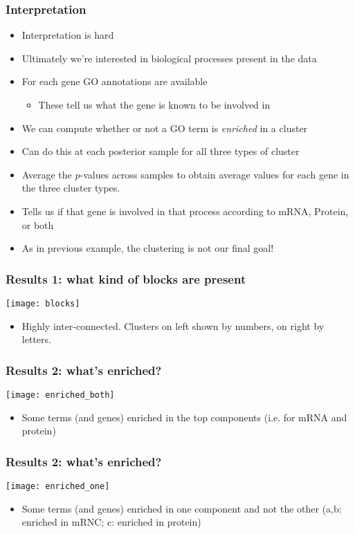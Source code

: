 \begin{frame}
	\frametitle{Interpretation}
	\begin{itemize}
		\item Interpretation is hard
		\item Ultimately we're interested in biological processes present in the data
		\item<2->For each gene \ac{GO} annotations are available
		\begin{itemize}
			\item These tell us what the gene is known to be involved in 
		\end{itemize}
		\item<3->We can compute whether or not a \ac{GO} term is \emph{enriched} in a cluster
		\item<4->Can do this at each posterior sample for all three types of cluster
		\item<5->Average the $p$-values across samples to obtain average values for each gene in the three cluster types.
		\item<6->Tells us if that gene is involved in that process according to mRNA, Protein, or both
		\item<7->As in previous example, the clustering is not our final goal!
	\end{itemize}
\end{frame}

\begin{frame}
	\frametitle{Results 1: what kind of blocks are present}
	\texttt{[image: blocks]}
	\begin{itemize}
		\item Highly inter-connected. Clusters on left shown by numbers, on right by letters.
	\end{itemize}
\end{frame}

\begin{frame}
	\frametitle{Results 2: what's enriched?}
	\texttt{[image: enriched\_both]}
	\begin{itemize}
		\item Some terms (and genes) enriched in the top components (i.e. for mRNA and protein)
	\end{itemize}
\end{frame}

\begin{frame}
	\frametitle{Results 2: what's enriched?}
	\texttt{[image: enriched\_one]}
	\begin{itemize}
		\item Some terms (and genes) enriched in one component and not the other (a,b: enriched in mRNC; c: enriched in protein)
	\end{itemize}
\end{frame}

